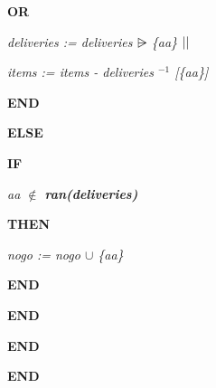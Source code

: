\documentclass[11pt]{article}
\begin{document}
\begin{sloppypar}
\hspace*{0.60in}\bf OR

\hspace*{0.80in}\it deliveries \rm := \it deliveries  $\nrres$  \rm \{\it aa\rm \}  $\mbox{$\mid\mid$}$ 

\hspace*{0.80in}\it items \rm := \it items \rm - \it deliveries $^{-1}$ \rm \rm [\rm \{\it aa\rm \}\rm \rm ]

\hspace*{0.60in}\bf END

\hspace*{0.40in}\bf ELSE

\hspace*{0.60in}\bf IF 

\hspace*{0.80in}\it aa  $\not\in$  \bf ran\rm (\it deliveries\rm ) 

\hspace*{0.60in}\bf THEN

\hspace*{0.80in}\it nogo \rm := \it nogo  $\cup$  \rm \{\it aa\rm \}

\hspace*{0.60in}\bf END

\hspace*{0.40in}\bf END

\hspace*{0.20in}\bf END

\hspace*{0.15in}

\bf END

\newpage
\end{sloppypar}
\end{document}
